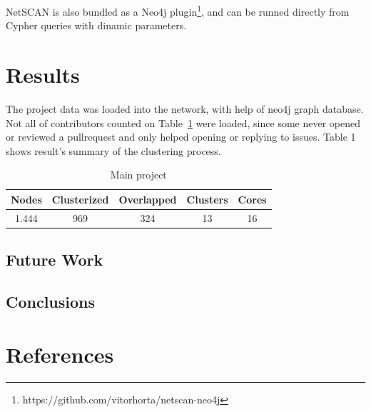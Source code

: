 \documentclass[conference]{IEEEtran}
\begin{document}
NetSCAN is also bundled as a Neo4j plugin\footnote{https://github.com/vitorhorta/netscan-neo4j}, and can be runned directly from Cypher queries with dinamic parameters.

\section{Results}

The project data was loaded into the network, with help of neo4j graph database. Not all of contributors counted on Table~\ref{tab:sizemetrics} were loaded, since some never opened or reviewed a pullrequest and only helped opening or replying to issues. Table 1 shows result's summary of the clustering process.

\begin{table}[htbp]
\caption{Main project}
\begin{center}
\begin{tabular}{|c|c|c|c|c|}
\hline
\textbf{Nodes} & \textbf{Clusterized}& \textbf{Overlapped} & \textbf{Clusters} & \textbf{Cores} \\
\hline
1.444 & 969 & 324 & 13 & 16 \\
\hline
\end{tabular}
\label{tab:sizemetrics}
\end{center}
\end{table}

\subsection{Future Work}

\subsection{Conclusions}

\section*{References}


\end{document}
